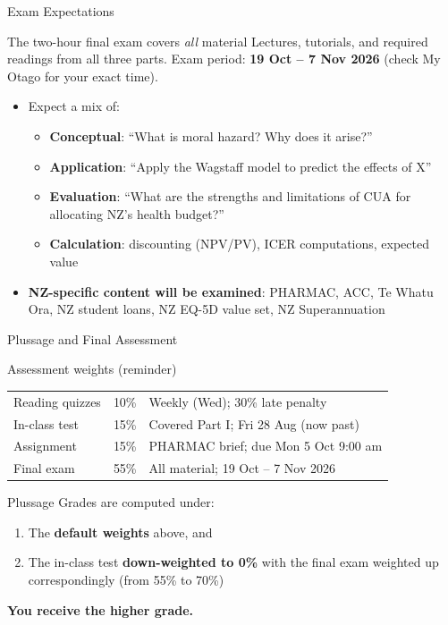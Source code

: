 \documentclass[aspectratio=169, 12pt]{beamer}
\begin{document}
\begin{frame}{Exam Expectations}
  \begin{block}{The two-hour final exam covers \emph{all} material}
    \small Lectures, tutorials, and required readings from all three parts. Exam period: \textbf{19 Oct -- 7 Nov 2026} (check My Otago for your exact time).
  \end{block}
  \vspace{0.15em}
  \small
  \begin{itemize}
    \item Expect a mix of:
    \begin{itemize}
      \item \textbf{Conceptual}: ``What is moral hazard? Why does it arise?''
      \item \textbf{Application}: ``Apply the Wagstaff model to predict the effects of X''
      \item \textbf{Evaluation}: ``What are the strengths and limitations of CUA for allocating NZ's health budget?''
      \item \textbf{Calculation}: discounting (NPV/PV), ICER computations, expected value
    \end{itemize}
    \item \textbf{NZ-specific content will be examined}: PHARMAC, ACC, Te Whatu Ora, NZ student loans, NZ EQ-5D value set, NZ Superannuation
  \end{itemize}
\end{frame}

\begin{frame}{Plussage and Final Assessment}
  \begin{alertblock}{Assessment weights (reminder)}
    \footnotesize
    \begin{tabular}{@{}lrl@{}}
      Reading quizzes & 10\% & Weekly (Wed); 30\% late penalty \\
      In-class test & 15\% & Covered Part I; Fri 28 Aug (now past) \\
      Assignment & 15\% & PHARMAC brief; due Mon 5 Oct 9:00 am \\
      Final exam & 55\% & All material; 19 Oct -- 7 Nov 2026 \\
    \end{tabular}
  \end{alertblock}
  \vspace{0.15em}
  \begin{block}{Plussage}
    \footnotesize Grades are computed under:
    \begin{enumerate}
      \item[(a)] The \textbf{default weights} above, and
      \item[(b)] The in-class test \textbf{down-weighted to 0\%} with the final exam weighted up correspondingly (from 55\% to 70\%)
    \end{enumerate}
    \textbf{You receive the higher grade.}
  \end{block}
\end{frame}
\end{document}
